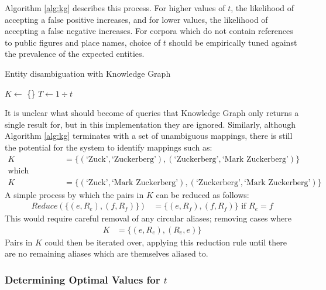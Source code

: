 Algorithm \ref{alg:kg} describes this process. For higher values of $t$, the likelihood of accepting a false positive increases, and for lower values, the likelihood of accepting a false negative increases. For corpora which do not contain references to public figures and place names, choice of $t$ should be empirically tuned against the prevalence of the expected entities.\\

\begin{algorithm}
\label{alg:kg}
 \caption{Entity disambiguation with Knowledge Graph}
 $K \gets$ \{\}\;
 $T \gets 1\div{t}$\;
\end{algorithm}

It is unclear what should become of queries that Knowledge Graph only returns a single result for, but in this implementation they are ignored. Similarly, although Algorithm \ref{alg:kg} terminates with a set of unambiguous mappings, there is still the potential for the system to identify mappings such as:
\begin{align*}
K &= \{(\text{`Zuck'}, \text{`Zuckerberg'}), (\text{`Zuckerberg'}, \text{`Mark Zuckerberg'})\} \\
\text{which simplifies to:}\\
K &= \{(\text{`Zuck'}, \text{`Mark Zuckerberg'}), (\text{`Zuckerberg'}, \text{`Mark Zuckerberg'})\}
\end{align*}
A simple process by which the pairs in $K$ can be reduced as follows:
\begin{align*}
Reduce(\{(e, R_e), (f, R_f)\}) &= \{(e, R_f), (f, R_f)\} \text{ if } R_e = f
\end{align*}
This would require careful removal of any circular aliases; removing cases where
\begin{align*}
K &= \{(e, R_e), (R_e, e)\}
\end{align*}
Pairs in $K$ could then be iterated over, applying this reduction rule until there are no remaining aliases which are themselves aliased to. 

\subsubsection{Determining Optimal Values for $t$}

